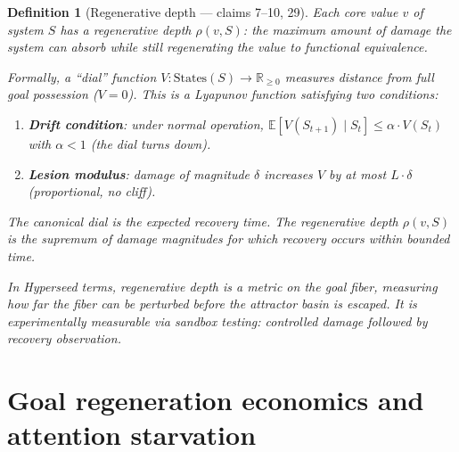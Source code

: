 \documentclass[11pt,a4paper]{article}
\newtheorem{definition}{Definition}[section]
\begin{document}
\begin{definition}[Regenerative depth --- claims 7--10, 29]
\label{def:depth}
Each core value $v$ of system $S$ has a \emph{regenerative depth}
$\rho(v, S)$: the maximum amount of damage the system can absorb while
still regenerating the value to functional equivalence.

Formally, a ``dial'' function $V : \text{States}(S) \to \mathbb{R}_{\geq 0}$
measures distance from full goal possession ($V = 0$). This is a
Lyapunov function satisfying two conditions:
\begin{enumerate}
\item \textbf{Drift condition}: under normal operation,
  $\mathbb{E}[V(S_{t+1}) \mid S_t] \leq \alpha \cdot V(S_t)$ with
  $\alpha < 1$ (the dial turns down).
\item \textbf{Lesion modulus}: damage of magnitude $\delta$ increases $V$
  by at most $L \cdot \delta$ (proportional, no cliff).
\end{enumerate}
The canonical dial is the expected recovery time. The regenerative depth
$\rho(v, S)$ is the supremum of damage magnitudes for which recovery
occurs within bounded time.

In Hyperseed terms, regenerative depth is a metric on the goal fiber,
measuring how far the fiber can be perturbed before the attractor basin
is escaped. It is experimentally measurable via sandbox testing:
controlled damage followed by recovery observation.
\end{definition}


\section{Goal regeneration economics and attention starvation}
\label{sec:economics}
\end{document}
